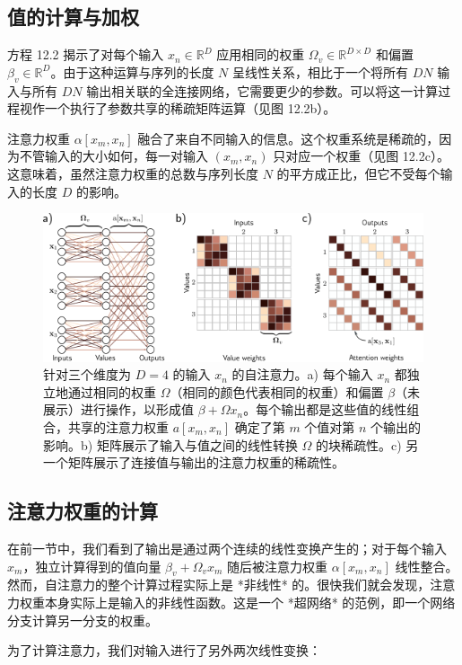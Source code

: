 \subsection{值的计算与加权}
方程 12.2 揭示了对每个输入 \(x_n \in \mathbb{R}^D\) 应用相同的权重 \(\Omega_v \in \mathbb{R}^{D \times D}\) 和偏置 \(\beta_v \in \mathbb{R}^D\)。由于这种运算与序列的长度 \(N\) 呈线性关系，相比于一个将所有 \(DN\) 输入与所有 \(DN\) 输出相关联的全连接网络，它需要更少的参数。可以将这一计算过程视作一个执行了参数共享的稀疏矩阵运算（见图 12.2b）。

注意力权重 \(\alpha[x_m, x_n]\) 融合了来自不同输入的信息。这个权重系统是稀疏的，因为不管输入的大小如何，每一对输入 \((x_m, x_n)\) 只对应一个权重（见图 12.2c）。这意味着，虽然注意力权重的总数与序列长度 \(N\) 的平方成正比，但它不受每个输入的长度 \(D\) 的影响。

\begin{figure}[ht!]
\centering
\includegraphics[width=0.7\linewidth]{png/chapter12/TransformerSA1.png}
\caption{针对三个维度为 \(D = 4\) 的输入 \(x_n\) 的自注意力。a) 每个输入 \(x_n\) 都独立地通过相同的权重 \(\Omega\)（相同的颜色代表相同的权重）和偏置 \(\beta\)（未展示）进行操作，以形成值 \(\beta + \Omega x_n\)。每个输出都是这些值的线性组合，共享的注意力权重 \(a[x_m, x_n]\) 确定了第 \(m\) 个值对第 \(n\) 个输出的影响。b) 矩阵展示了输入与值之间的线性转换 \(\Omega\) 的块稀疏性。c) 另一个矩阵展示了连接值与输出的注意力权重的稀疏性。}
\end{figure}


\subsection{注意力权重的计算}
在前一节中，我们看到了输出是通过两个连续的线性变换产生的；对于每个输入 \(x_m\)，独立计算得到的值向量 \(\beta_v + \Omega_vx_m\) 随后被注意力权重 \(\alpha[x_m, x_n]\) 线性整合。然而，自注意力的整个计算过程实际上是 *非线性* 的。很快我们就会发现，注意力权重本身实际上是输入的非线性函数。这是一个 *超网络* 的范例，即一个网络分支计算另一分支的权重。

为了计算注意力，我们对输入进行了另外两次线性变换：


